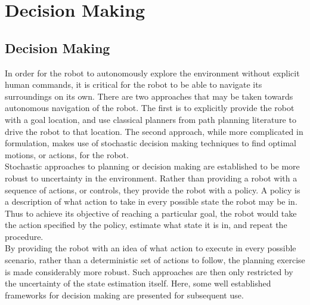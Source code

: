 
\chapter{Decision Making}
 
\section{Decision Making}
In order for the robot to autonomously explore the environment without explicit human commands, it is critical for the robot to be able to navigate its surroundings on its own. There are two approaches that may be taken towards autonomous navigation of the robot. The first is to explicitly provide the robot with a goal location, and use classical planners from  path planning literature to drive the robot to that location. The second approach, while more complicated in formulation, makes use of stochastic decision making techniques to find optimal motions, or actions, for the robot.\\


Stochastic approaches to planning or decision making are established to be more robust to uncertainty in the environment. Rather than providing a robot with a sequence of actions, or controls, they provide the robot with a policy. A policy is a description of what action to take in every possible state the robot may be in. Thus to achieve its objective of reaching a particular goal, the robot would take the action specified by the policy, estimate what state it is in, and repeat the procedure. \\

By providing the robot with an idea of what action to execute in every possible scenario, rather than a deterministic set of actions to follow, the planning exercise is made considerably more robust. Such approaches are then only restricted by the uncertainty of the state estimation itself. Here, some well established frameworks for decision making are presented for subsequent use. 

